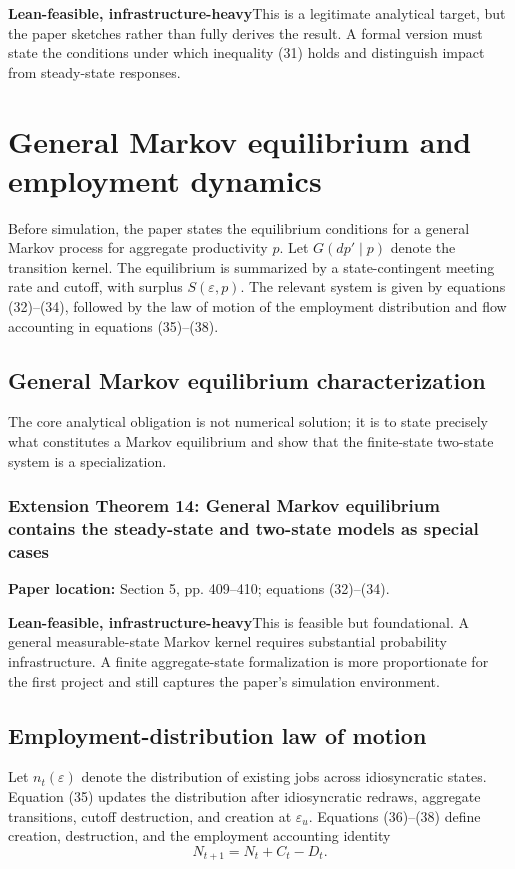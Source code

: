 \documentclass[11pt]{article}
\newcommand{\leaninfra}{\textcolor{darkamber}{\textbf{Lean-feasible, infrastructure-heavy}}}
\newcommand{\papersec}[1]{\textbf{Paper location:} #1}
\newcommand{\statusbox}[2]{\colorbox{#1}{\parbox{0.94\linewidth}{#2}}}
\newcommand{\epsu}{\varepsilon_u}
\begin{document}
\statusbox{softamber}{\leaninfra\quad This is a legitimate analytical target, but the paper sketches rather than fully derives the result. A formal version must state the conditions under which inequality (31) holds and distinguish impact from steady-state responses.}

\section{General Markov equilibrium and employment dynamics}

Before simulation, the paper states the equilibrium conditions for a general Markov process for aggregate productivity $p$. Let $G(dp'\mid p)$ denote the transition kernel. The equilibrium is summarized by a state-contingent meeting rate and cutoff, with surplus $S(\varepsilon,p)$. The relevant system is given by equations (32)--(34), followed by the law of motion of the employment distribution and flow accounting in equations (35)--(38).

\subsection{General Markov equilibrium characterization}
The core analytical obligation is not numerical solution; it is to state precisely what constitutes a Markov equilibrium and show that the finite-state two-state system is a specialization.

\subsubsection*{Extension Theorem 14: General Markov equilibrium contains the steady-state and two-state models as special cases}
\papersec{Section 5, pp. 409--410; equations (32)--(34).}

\statusbox{softamber}{\leaninfra\quad This is feasible but foundational. A general measurable-state Markov kernel requires substantial probability infrastructure. A finite aggregate-state formalization is more proportionate for the first project and still captures the paper's simulation environment.}

\subsection{Employment-distribution law of motion}
Let $n_t(\varepsilon)$ denote the distribution of existing jobs across idiosyncratic states. Equation (35) updates the distribution after idiosyncratic redraws, aggregate transitions, cutoff destruction, and creation at $\epsu$. Equations (36)--(38) define creation, destruction, and the employment accounting identity
\begin{equation}
N_{t+1}=N_t+C_t-D_t. \tag{38}
\end{equation}
\end{document}
